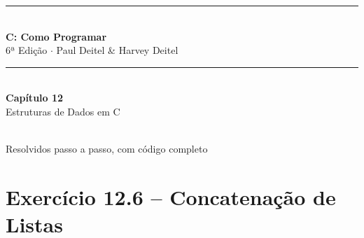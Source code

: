 \documentclass[12pt,a4paper]{article}
\begin{document}
\begin{titlepage}
  \centering\vspace*{2cm}
  {\color{deitelblue}\rule{\linewidth}{2pt}}\\[0.4cm]
  {\huge\bfseries\color{deitelblue}C: Como Programar}\\[0.2cm]
  {\large\color{deitelblue}6ª Edição $\cdot$ Paul Deitel \& Harvey Deitel}\\[0.2cm]
  {\color{deitelblue}\rule{\linewidth}{2pt}}\\[1cm]
  {\LARGE\bfseries Capítulo 12}\\[0.3cm]
  {\Large\color{deitelblue!80}Estruturas de Dados em C}\\[0.8cm]
  \begin{tcolorbox}[colback=deitellightblue,colframe=deitelblue,width=0.85\linewidth]
    \\[0.2cm]
    {\normalsize Resolvidos passo a passo, com código completo}
  \end{tcolorbox}
\end{titlepage}

\tableofcontents\newpage

\section{Exercício 12.6 -- Concatenação de Listas}
\end{document}
